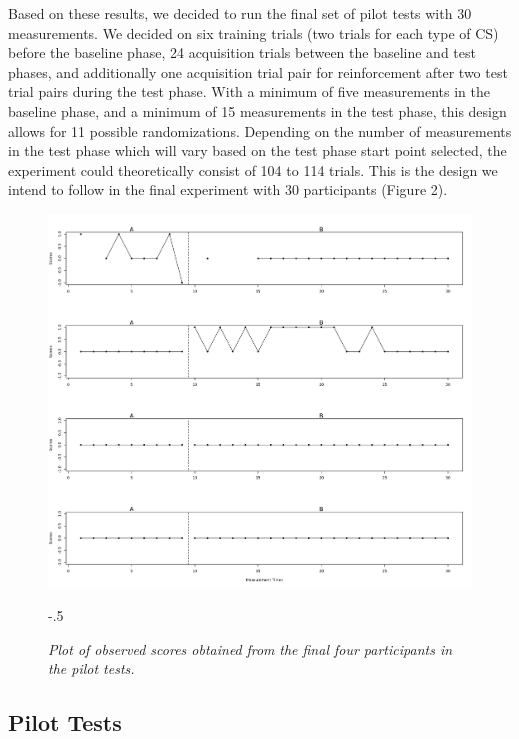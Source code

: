 \documentclass[empirical,issue, twocolumn,authordate]{jote-new-article}
\begin{document}
Based on these results, we decided to run the final set of pilot tests with 30 measurements. We decided on six training trials (two trials for each type of CS) before the baseline phase, 24 acquisition trials between the baseline and test phases, and additionally one acquisition trial pair for reinforcement after two test trial pairs during the test phase. With a minimum of five measurements in the baseline phase, and a minimum of 15 measurements in the test phase, this design allows for 11 possible randomizations. Depending on the number of measurements in the test phase which will vary based on the test phase start point selected, the experiment could theoretically consist of 104 to 114 trials. This is the design we intend to follow in the final experiment with 30 participants (Figure 2).

\begin{figure}[t!]
\captionsetup{width=\dimexpr \linewidth+\fullwidthlen\relax}
\begin{fullwidth}
\includegraphics[width=\linewidth]{media/Other,+Figure+4.png}
\end{fullwidth}
\begin{adjustwidth}{-.5\fullwidthlen}{}
\caption{\emph{Plot of observed scores obtained }\emph{from}\emph{ the final four participants in the pilot tests.}}
\label{fig:fig4}
\end{adjustwidth}
\end{figure}
\subsection{Pilot Tests}
\end{document}
